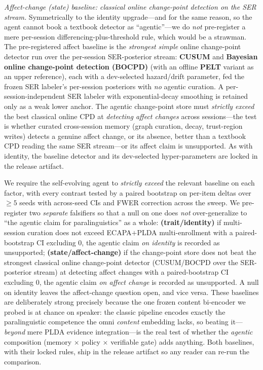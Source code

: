 \emph{Affect-change (state) baseline: classical online change-point detection on the SER stream.} Symmetrically to the identity upgrade---and for the same reason, so the agent cannot book a textbook detector as ``agentic''---we do \emph{not} pre-register a mere per-session differencing-plus-threshold rule, which would be a strawman. The pre-registered affect baseline is the \emph{strongest simple} online change-point detector run over the per-session SER-posterior stream: \textbf{CUSUM} and \textbf{Bayesian online change-point detection (BOCPD)} (with an offline \textbf{PELT} variant as an upper reference), each with a dev-selected hazard/drift parameter, fed the frozen SER labeler's per-session posteriors with \emph{no} agentic curation. A per-session-independent SER labeler with exponential-decay smoothing is retained only as a weak lower anchor. The agentic change-point store must \emph{strictly exceed} the best classical online CPD at \emph{detecting affect changes} across sessions---the test is whether curated cross-session memory (graph curation, decay, trust-region writes) detects a genuine affect change, or its absence, better than a textbook CPD reading the same SER stream---or its affect claim is unsupported. As with identity, the baseline detector and its dev-selected hyper-parameters are locked in the release artifact.

We require the self-evolving agent to \emph{strictly exceed} the relevant baseline on each factor, with every contrast tested by a paired bootstrap on per-item deltas \citep{bisani2004bootstrap} over $\geq 5$ seeds with across-seed CIs and FWER correction across the sweep. We pre-register two \emph{separate} falsifiers so that a null on one does \emph{not} over-generalize to ``the agentic claim for paralinguistics'' as a whole: \textbf{(trait/identity)} if multi-session curation does not exceed ECAPA$+$PLDA multi-enrollment with a paired-bootstrap CI excluding $0$, the agentic claim \emph{on identity} is recorded as unsupported; \textbf{(state/affect-change)} if the change-point store does not beat the strongest classical online change-point detector (CUSUM/BOCPD over the SER-posterior stream) at detecting affect changes with a paired-bootstrap CI excluding $0$, the agentic claim \emph{on affect change} is recorded as unsupported. A null on identity leaves the affect-change question open, and vice versa. These baselines are deliberately strong precisely because the one frozen content bi-encoder we probed is at chance on speaker: the classic pipeline encodes exactly the paralinguistic competence the omni \emph{content} embedding lacks, so beating it---\emph{beyond} mere PLDA evidence integration---is the real test of whether the \emph{agentic} composition (memory $\times$ policy $\times$ verifiable gate) adds anything. Both baselines, with their locked rules, ship in the release artifact so any reader can re-run the comparison.

